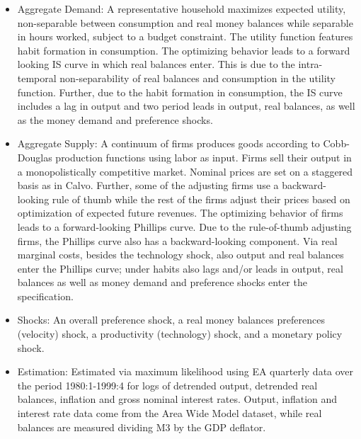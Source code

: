 \documentclass[11pt,a4paper]{article}
\begin{document}
	\begin{itemize}
		
		\item Aggregate Demand: A representative household maximizes expected utility, non-separable between consumption and real money balances while separable in hours worked, subject to a budget constraint. The utility function features habit formation in consumption. The optimizing behavior leads to a forward looking IS curve in which real balances enter. This is due to the intra-temporal non-separability of real balances and consumption in the utility function. Further, due to the habit formation in consumption, the IS curve includes a lag
		in output and two period leads in output, real balances, as well as the money demand and preference shocks.
		
		\item Aggregate Supply: A continuum of firms produces goods according to Cobb-Douglas production functions using labor as input. Firms sell their output in a monopolistically competitive market. Nominal prices are set on a staggered basis as in Calvo. Further, some of the adjusting firms use a backward-looking rule of thumb while the rest of the firms adjust their prices based on optimization of expected future revenues. The optimizing behavior of firms leads to a forward-looking Phillips curve. Due to the rule-of-thumb adjusting firms, the Phillips curve also has a backward-looking component. Via real marginal costs, besides the technology shock, also output and real balances enter the Phillips curve; under habits also lags and/or leads in output, real balances as well as money demand and preference shocks enter the specification.
		
		\item Shocks: An overall preference shock, a real money balances preferences (velocity) shock, a productivity (technology) shock, and a monetary policy shock.
		
		\item Estimation: Estimated via maximum likelihood using EA quarterly data over the period 1980:1-1999:4 for logs of detrended output, detrended real balances, inflation and gross nominal interest rates. Output, inflation and interest rate data come from the Area Wide Model dataset, while real balances are measured dividing M3 by the GDP deflator.
		
	\end{itemize}
	
	
	
\end{document}
